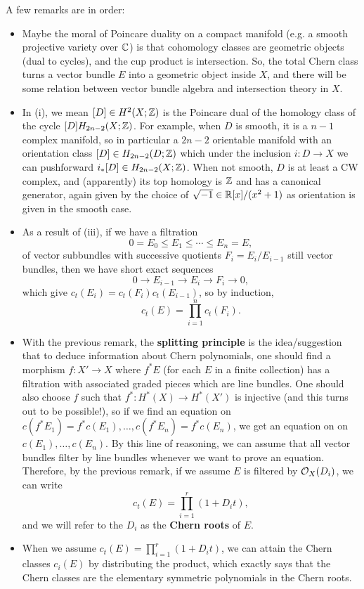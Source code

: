 \documentclass[12pt]{article}
\begin{document}
A few remarks are in order:
\begin{itemize}
    \item Maybe the moral of Poincare duality on a compact manifold (e.g. a smooth projective variety over $\mathbb{C}$) is that cohomology classes are geometric objects (dual to cycles), and the cup product is intersection. So, the total Chern class turns a vector bundle $E$ into a geometric object inside $X$, and there will be some relation between vector bundle algebra and intersection theory in $X$.
    \item In (i), we mean $[D]\in H^2(X;\mathbb{Z})$ is the Poincare dual of the homology class of the cycle $[D] H_{2n-2}(X;\mathbb{Z})$. For example, when $D$ is smooth, it is a $n-1$ complex manifold, so in particular a $2n-2$ orientable manifold with an orientation class $[D]\in H_{2n-2}(D;\mathbb{Z})$ which under the inclusion $i:D\to X$ we can pushforward $i_*[D] \in H_{2n-2}(X;\mathbb{Z})$. When not smooth, $D$ is at least a CW complex, and (apparently) its top homology is $\mathbb{Z}$ and has a canonical generator, again given by the choice of $\sqrt{-1}\in \mathbb{R}[x]/(x^2+1)$ as orientation is given in the smooth case.
    \item As a result of (iii), if we have a filtration
    \[0=E_0 \leq E_1 \leq \cdots \leq E_n=E,\]
    of vector subbundles with successive quotients $F_i = E_i/E_{i-1}$ still vector bundles, then we have short exact sequences
    \[0\to E_{i-1} \to E_i \to F_i \to 0,\]
    which give $c_t(E_i) = c_t(F_i)c_t(E_{i-1})$, so by induction,
    \[c_t(E) = \prod_{i=1}^n c_t(F_i).\]
    \item With the previous remark, the \textbf{splitting principle} is the idea/suggestion that to deduce information about Chern polynomials, one should find a morphism $f:X'\to X$ where $f^*E$ (for each $E$ in a finite collection) has a filtration with associated graded pieces which are line bundles. One should also choose $f$ such that $f^*: H^*(X) \to H^*(X')$ is injective (and this turns out to be possible!), so if we find an equation on $c(f^*E_1)=f^*c(E_1),\dots,c(f^*E_n)=f^*c(E_n)$, we get an equation on on $c(E_1),\dots,c(E_n)$. By this line of reasoning, we can assume that all vector bundles filter by line bundles whenever we want to prove an equation. Therefore, by the previous remark, if we assume $E$ is filtered by $\mathcal{O}_X(D_i)$, we can write
    \[c_t(E) = \prod_{i=1}^r (1+D_it),\]
    and we will refer to the $D_i$ as the \textbf{Chern roots} of $E$.
    \item When we assume $c_t(E) = \prod_{i=1}^r (1+D_i t)$, we can attain the Chern classes $c_i(E)$ by distributing the product, which exactly says that the Chern classes are the elementary symmetric polynomials in the Chern roots.

\end{itemize}
\end{document}
